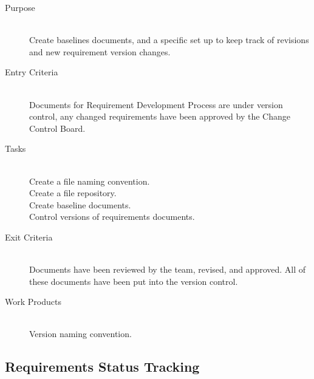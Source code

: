 \documentclass[11pt]{article}
\begin{document}
\begin{description}

\item[Purpose] \hfill \\
Create baselines documents, and a specific set up to keep track of revisions and new requirement version changes.


\item[Entry Criteria]\hfill \\
Documents for Requirement Development Process are under version control, any changed requirements have been approved by the Change Control Board.


\item[Tasks]\hfill \\
Create a file naming convention.\\
Create a file repository.\\
Create baseline documents.\\
Control versions of requirements documents.\\


\item[Exit Criteria]\hfill \\
Documents have been reviewed by the team, revised, and approved. All of these documents have been put into the version control.
  

\item[Work Products]\hfill \\
Version naming convention.
\\


\end{description}

\subsection{Requirements Status Tracking}
\end{document}
